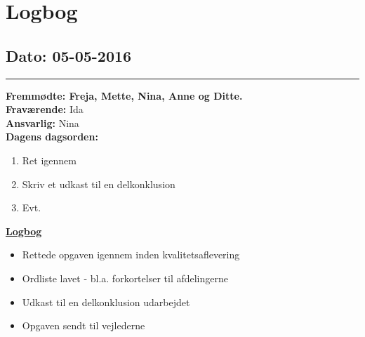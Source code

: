 \chapter{Logbog}
\section{Dato: 05-05-2016}
\hrule
\textbf{Fremmødte: Freja, Mette, Nina, Anne og Ditte.} \\
\textbf{Fraværende: } Ida \\
\textbf{Ansvarlig: } Nina \\
\textbf{Dagens dagsorden: }
\begin{enumerate}
\item Ret igennem
\item Skriv et udkast til en delkonklusion
\item Evt.
\end{enumerate}
\underline{\textbf{Logbog}}
\begin{itemize}
\item Rettede opgaven igennem inden kvalitetsaflevering
\item Ordliste lavet - bl.a. forkortelser til afdelingerne
\item Udkast til en delkonklusion udarbejdet
\item Opgaven sendt til vejlederne
\end{itemize}
